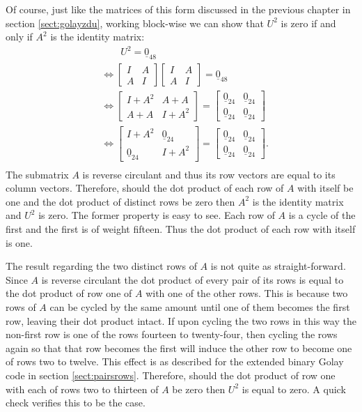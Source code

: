 Of course, just like the matrices of this form discussed in the previous chapter in section \ref{sect:golayzdu}, working block-wise we can show that $U^2$ is zero if and only if $A^2$ is the identity matrix:
\begin{equation*}
\begin{split}
&\qquad U^2 = \underline{0}_{48} \\
&\Leftrightarrow \left[ \begin{array}{cc} I & A \\ A & I \end{array} \right] \left[ \begin{array}{cc} I & A \\ A & I \end{array} \right] = \underline{0}_{48} \\
&\Leftrightarrow \left[ \begin{array}{cc} I + A^2 & A + A \\ A + A & I + A^2 \end{array} \right]  = \left[ \begin{array}{cc} \underline{0}_{24} & \underline{0}_{24} \\ \underline{0}_{24} & \underline{0}_{24} \end{array} \right] \\
&\Leftrightarrow \left[ \begin{array}{cc} I + A^2 & \underline{0}_{24} \\ \underline{0}_{24} & I + A^2 \end{array} \right]  = \left[ \begin{array}{cc} \underline{0}_{24} & \underline{0}_{24} \\ \underline{0}_{24} & \underline{0}_{24} \end{array} \right]. \\
\end{split}
\end{equation*}
The submatrix $A$ is reverse circulant and thus its row vectors are equal to its column vectors.
Therefore, should the dot product of each row of $A$ with itself be one and the dot product of distinct rows be zero then $A^2$ is the identity matrix and $U^2$ is zero.
The former property is easy to see.
Each row of $A$ is a cycle of the first and the first is of weight fifteen.
Thus the dot product of each row with itself is one.

The result regarding the two distinct rows of $A$ is not quite as straight-forward.
Since $A$ is reverse circulant the dot product of every pair of its rows is equal to the dot product of row one of $A$ with one of the other rows.
This is because two rows of $A$ can be cycled by the same amount until one of them becomes the first row, leaving their dot product intact.
If upon cycling the two rows in this way the non-first row is one of the rows fourteen to twenty-four, then cycling the rows again so that that row becomes the first will induce the other row to become one of rows two to twelve.
This effect is as described for the extended binary Golay code in section \ref{sect:pairsrows}.
Therefore, should the dot product of row one with each of rows two to thirteen of $A$ be zero then $U^2$ is equal to zero.
A quick check verifies this to be the case.

